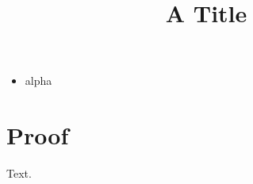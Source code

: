 \documentclass{IEEEtran}
\begin{document}
\title{A Title}
\maketitle
\begin{itemize}[\nocalcleftmargintrue\leftmargin=12pt]
\item alpha
\end{itemize}
\useRomanappendicesfalse
\appendices
\section{Proof}
Text.
\end{document}
